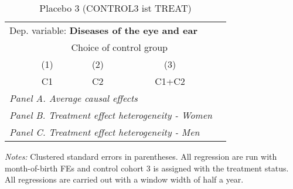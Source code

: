  \begin{table}[H] \centering \begin{threeparttable} \caption{Placebo 3 (CONTROL3 ist TREAT) } {\def\sym#1{\ifmmode^{#1}\else\(^{#1}\)\fi} \begin{tabular}{l*{4}{c}} \toprule \multicolumn{4}{l}{Dep. variable: \textbf{Diseases of the eye and ear}} \\ & \multicolumn{3}{c}{Choice of control group} \\ \cmidrule(lr){2-4}
            &\multicolumn{1}{c}{(1)}&\multicolumn{1}{c}{(2)}&\multicolumn{1}{c}{(3)}\\
            &\multicolumn{1}{c}{C1}&\multicolumn{1}{c}{C2}&\multicolumn{1}{c}{C1+C2}\\
\midrule
 \multicolumn{4}{l}{\emph{Panel A. Average causal effects}} \\      \midrule\multicolumn{4}{l}{\emph{Panel B. Treatment effect heterogeneity - Women}} \\      \midrule\multicolumn{4}{l}{\emph{Panel C. Treatment effect heterogeneity - Men}} \\      
\bottomrule \end{tabular} } \begin{tablenotes} \item \scriptsize \emph{Notes:} Clustered standard errors in parentheses. All regression are run with month-of-birth FEs and control cohort 3 is assigned with the treatment status. All regressions are carried out with a window width of half a year. \end{tablenotes} \end{threeparttable} \end{table} 
